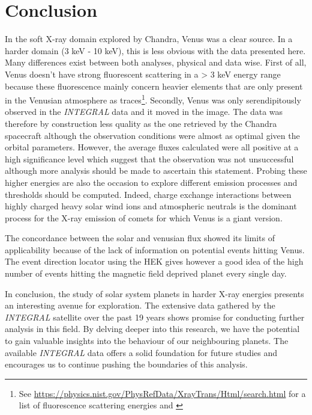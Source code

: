 \section{Conclusion}

In the soft X-ray domain explored by Chandra, Venus was a clear source. In a harder domain (3 keV - 10 keV), this is less obvious with the data presented here. Many differences exist between both analyses, physical and data wise. First of all, Venus doesn't have strong fluorescent scattering in a > 3 keV energy range because these fluorescence mainly concern heavier elements that are only present in the Venusian atmosphere as traces\footnote{See \url{https://physics.nist.gov/PhysRefData/XrayTrans/Html/search.html} for a list of fluorescence scattering energies and \cite{Futaana2017SolarAtmosphere}}. Secondly, Venus was only serendipitously observed in the \textit{INTEGRAL} data and it moved in the image. The data was therefore by construction less quality as the one retrieved by the Chandra spacecraft although the observation conditions were almost as optimal given the orbital parameters. However, the average fluxes calculated were all positive at a high significance level which suggest that the observation was not unsuccessful although more analysis should be made to ascertain this statement. Probing these higher energies are also the occasion to explore different emission processes and thresholds should be computed. Indeed, charge exchange interactions between highly charged heavy solar wind ions and atmospheric neutrals is the dominant process for the X-ray emission of comets for which Venus is a giant version\cite{Futaana2017SolarAtmosphere}.

The concordance between the solar and venusian flux showed its limits of applicability because of the lack of information on potential events hitting Venus. The event direction locator using the HEK gives however a good idea of the high number of events hitting the magnetic field deprived planet every single day.

In conclusion, the study of solar system planets in harder X-ray energies presents an interesting avenue for exploration. The extensive data gathered by the \textit{INTEGRAL} satellite over the past 19 years shows promise for conducting further analysis in this field. By delving deeper into this research, we have the potential to gain valuable insights into the behaviour of our neighbouring planets. The available \textit{INTEGRAL} data offers a solid foundation for future studies and encourages us to continue pushing the boundaries of this analysis.
